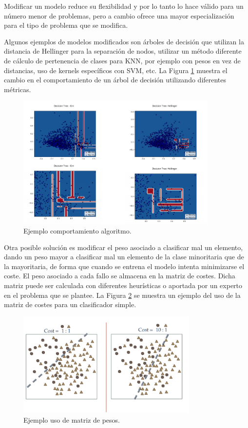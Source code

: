 Modificar un modelo reduce su flexibilidad y por lo tanto lo hace válido para un número menor de problemas, pero a cambio ofrece una mayor especialización para el tipo de problema que se modifica.\newline

Algunos ejemplos de modelos modificados son árboles de decisión que utilizan la distancia de Hellinger para la separación de nodos, utilizar un método diferente de cálculo de pertenencia de clases para KNN, por ejemplo con pesos en vez de distancias, uso de kernels específicos con SVM, etc. La Figura \ref{fig:25} muestra el cambio en el comportamiento de un árbol de decisión utilizando diferentes métricas.\newline

\begin{figure}[H]
	\centering
	\includegraphics[width=100mm]{imagenes/hellinger-example.png}
	\caption{Ejemplo comportamiento algoritmo.}
	\label{fig:25}
\end{figure}
\verticalspace

Otra posible solución es modificar el peso asociado a clasificar mal un elemento, dando un peso mayor a clasificar mal un elemento de la clase minoritaria que de la mayoritaria, de forma que cuando se entrena el modelo intenta minimizarse el coste. El peso asociado a cada fallo se almacena en la matriz de costes. Dicha matriz puede ser calculada con diferentes heurísticas o aportada por un experto en el problema que se plantee. La Figura \ref{fig:26} se muestra un ejemplo del uso de la matriz de costes para un clasificador simple.\newline

\begin{figure}[H]
	\centering
	\includegraphics[width=90mm]{imagenes/cost-sentitive.png}
	\caption{Ejemplo uso de matriz de pesos.}
	\label{fig:26}
\end{figure}
\verticalspace

